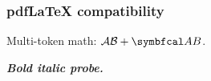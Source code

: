 \documentclass[12pt]{beamer}
\begin{document}
\begin{frame}
  \frametitle{pdfLaTeX compatibility}
  Multi-token math: $\mathcal{AB}+\mathbcal{AB}$.

  \textbf{\textit{Bold italic probe.}}
\end{frame}
\end{document}
